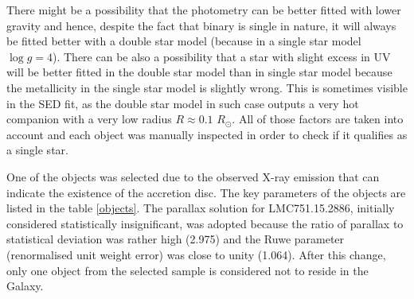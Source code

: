 \documentclass{pracalicmgr}
\begin{document}
There might be a possibility that the photometry can be better fitted with lower gravity and hence, despite the fact that binary
is single in nature, it will always be fitted better with a double star model (because in a single star model $\log g=4$).
There can be also a possibility that a star with slight excess in UV will be better fitted in the double star model than in single star model
because the metallicity in the single star model is slightly wrong. This is sometimes visible in the SED fit, as the double star model in such case
outputs a very hot companion with a very low radius $R\approx 0.1$ $R_\odot$. All of those factors are taken into account 
and each object was manually inspected in order to check if it qualifies as a single star.


One of the objects was selected due to the observed X-ray emission 
that can indicate the existence of the accretion disc.
The key parameters of the objects are listed in the table \ref{objects}.
The parallax
solution for LMC751.15.2886, initially considered statistically insignificant, was adopted
because the ratio of parallax to statistical deviation was rather high (2.975) and
the Ruwe parameter (renormalised unit weight error) was close to unity (1.064). After this
change, only one object from the selected sample is considered not to reside in the Galaxy.
\end{document}
